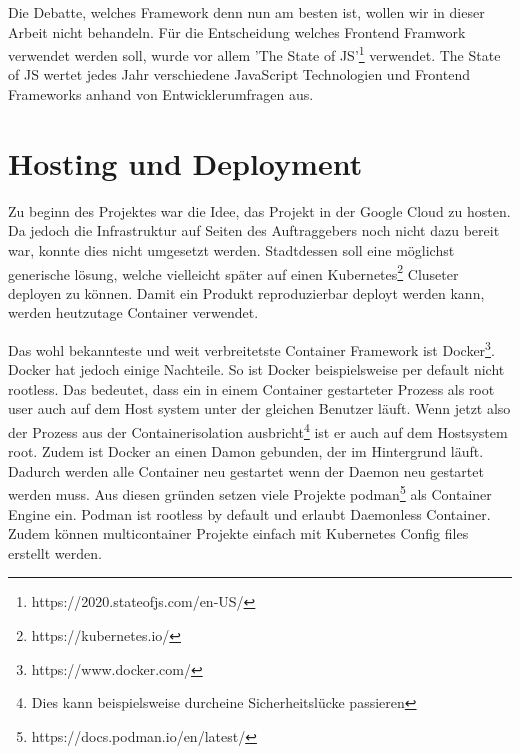 Die Debatte, welches Framework denn nun am besten ist, wollen wir in dieser Arbeit nicht behandeln.
Für die Entscheidung welches Frontend Framwork verwendet werden soll, wurde vor allem 'The State of JS'\footnote{https://2020.stateofjs.com/en-US/}
verwendet. The State of JS wertet jedes Jahr verschiedene JavaScript Technologien und Frontend Frameworks
anhand von Entwicklerumfragen aus.\cite{state-of-js-2020-fwk}




\section{Hosting und Deployment}

Zu beginn des Projektes war die Idee, das Projekt in der Google Cloud zu hosten.
Da jedoch die Infrastruktur auf Seiten des Auftraggebers noch nicht dazu bereit
war, konnte dies nicht umgesetzt werden. Stadtdessen soll eine möglichst
generische lösung, welche vielleicht später auf einen Kubernetes\footnote{https://kubernetes.io/}
Cluseter deployen zu können. Damit ein Produkt reproduzierbar
deployt werden kann, werden heutzutage Container verwendet. \cite{what-is-a-container}

Das wohl bekannteste und weit verbreitetste Container Framework
ist Docker\footnote{https://www.docker.com/}. Docker hat jedoch einige Nachteile.
So ist Docker beispielsweise per default nicht rootless.\cite{docker:rootless}
Das bedeutet, dass ein in einem Container gestarteter Prozess als root user
auch auf dem Host system unter der gleichen Benutzer läuft. Wenn jetzt also
der Prozess aus der Containerisolation ausbricht\footnote{Dies kann beispielsweise durcheine Sicherheitslücke passieren}
ist er auch auf dem Hostsystem root.\cite{so_2020}
Zudem ist Docker an einen Damon gebunden, der im Hintergrund läuft.
Dadurch werden alle Container neu gestartet wenn der Daemon neu gestartet werden muss.\cite{docker:daemon}
Aus diesen gründen setzen viele Projekte podman\footnote{https://docs.podman.io/en/latest/}
als Container Engine ein. Podman ist rootless by default und erlaubt Daemonless Container.
Zudem können multicontainer Projekte einfach mit Kubernetes Config files
erstellt werden.\cite{redhat:podman-pods}
